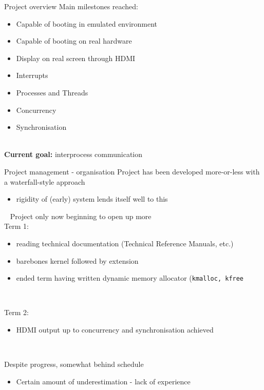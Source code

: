 \documentclass[10pt]{beamer}
\newcommand{\code}[1]{\texttt{#1}}
\begin{document}
\begin{frame}{Project overview}
    Main milestones reached:
    \begin{itemize}
        \item Capable of booting in emulated environment
        \item Capable of booting on real hardware
        \item Display on real screen through HDMI
        \item Interrupts
        \item Processes and Threads
        \item Concurrency
        \item Synchronisation
    \end{itemize} ~\\

    \textbf{Current goal:} interprocess communication
\end{frame}

\begin{frame}{Project management - organisation}
    Project has been developed more-or-less with a waterfall-style approach
    \begin{itemize}
        \item rigidity of (early) system lends itself well to this
    \end{itemize} ~
    Project only now beginning to open up more \\

    Term 1:
    \begin{itemize}
        \item reading technical documentation (Technical Reference Manuals, etc.)
        \item barebones kernel followed by extension
        \item ended term having written dynamic memory allocator (\code{kmalloc, kfree}
    \end{itemize} ~

    Term 2:
    \begin{itemize}
        \item HDMI output up to concurrency and synchronisation achieved
    \end{itemize} ~

    Despite progress, somewhat behind schedule
    \begin{itemize}
        \item Certain amount of underestimation - lack of experience
    \end{itemize}
\end{frame}
\end{document}
